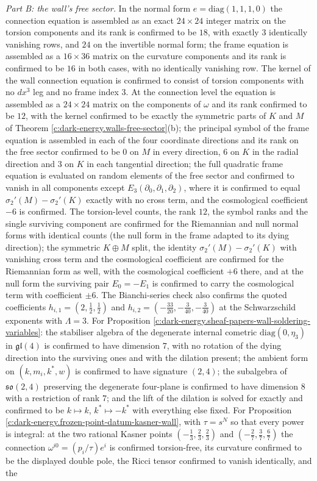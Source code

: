 \documentclass[11pt]{article}
\theoremstyle{definition}
\theoremstyle{plain}
\begin{document}
\emph{Part B: the wall's free sector.} In the normal form $e = \mathrm{diag}(1,1,1,0)$ the connection equation is assembled as an exact $24\times 24$ integer matrix on the torsion components and its rank is confirmed to be $18$, with exactly $3$ identically vanishing rows, and $24$ on the invertible normal form; the frame equation is assembled as a $16\times 36$ matrix on the curvature components and its rank is confirmed to be $16$ in both cases, with no identically vanishing row. The kernel of the wall connection equation is confirmed to consist of torsion components with no $dx^3$ leg and no frame index $3$. At the connection level the equation is assembled as a $24\times 24$ matrix on the components of $\omega$ and its rank confirmed to be $12$, with the kernel confirmed to be exactly the symmetric parts of $K$ and $M$ of Theorem \ref{c:dark-energy.walls-free-sector}(b); the principal symbol of the frame equation is assembled in each of the four coordinate directions and its rank on the free sector confirmed to be $0$ on $M$ in every direction, $6$ on $K$ in the radial direction and $3$ on $K$ in each tangential direction; the full quadratic frame equation is evaluated on random elements of the free sector and confirmed to vanish in all components except $E_3(\partial_0,\partial_1,\partial_2)$, where it is confirmed to equal $\sigma_2'(M) - \sigma_2'(K)$ exactly with no cross term, and the cosmological coefficient $-6$ is confirmed. The torsion-level counts, the rank $12$, the symbol ranks and the single surviving component are confirmed for the Riemannian and null normal forms with identical counts (the null form in the frame adapted to its dying direction); the symmetric $K \oplus M$ split, the identity $\sigma_2'(M) - \sigma_2'(K)$ with vanishing cross term and the cosmological coefficient are confirmed for the Riemannian form as well, with the cosmological coefficient $+6$ there, and at the null form the surviving pair $E_0 = -E_1$ is confirmed to carry the cosmological term with coefficient $\pm 6$. The Bianchi-series check also confirms the quoted coefficients $h_{i,1} = (2, \tfrac12, \tfrac12)$ and $h_{i,2} = (-\tfrac{33}{20}, -\tfrac{3}{40}, -\tfrac{3}{40})$ at the Schwarzschild exponents with $\Lambda = 3$. For Proposition \ref{c:dark-energy.sheaf-papers-wall-soldering-variables}: the stabiliser algebra of the degenerate internal cometric $\mathrm{diag}(0,\eta_3)$ in $\mathfrak{gl}(4)$ is confirmed to have dimension $7$, with no rotation of the dying direction into the surviving ones and with the dilation present; the ambient form on $(k, m_i, k^*, w)$ is confirmed to have signature $(2,4)$; the subalgebra of $\mathfrak{so}(2,4)$ preserving the degenerate four-plane is confirmed to have dimension $8$ with a restriction of rank $7$; and the lift of the dilation is solved for exactly and confirmed to be $k \mapsto k$, $k^* \mapsto -k^*$ with everything else fixed. For Proposition \ref{c:dark-energy.frozen-point-datum-kasner-wall}, with $\tau = s^N$ so that every power is integral: at the two rational Kasner points $(-\tfrac13,\tfrac23,\tfrac23)$ and $(-\tfrac27,\tfrac37,\tfrac67)$ the connection $\omega^{i0} = (p_i/\tau)e^i$ is confirmed torsion-free, its curvature confirmed to be the displayed double pole, the Ricci tensor confirmed to vanish identically, and the 
\end{document}
